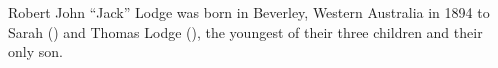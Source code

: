 
Robert John ``Jack'' Lodge was born in Beverley, Western Australia in 1894
to Sarah () and Thomas Lodge (),\cite{JackLodgeBirthCert}
the youngest of their three children and their only son.
